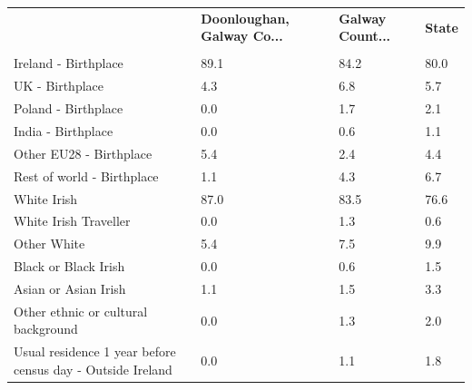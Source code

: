 \documentclass{article}
\begin{document}
\pagebreak
\begin{table}[h]	
\centering
		\begin{tabular}{KTTT}
  \hline
& \textbf{Doonloughan, Galway Co...} & \textbf{Galway Count...} & \textbf{State}\\ 
  \hline
    \\ 
    \hline
Ireland - Birthplace & 89.1& 84.2& 80.0\\
UK - Birthplace & 4.3& 6.8& 5.7\\
Poland - Birthplace & 0.0& 1.7& 2.1\\
India - Birthplace & 0.0& 0.6& 1.1\\
Other EU28 - Birthplace & 5.4& 2.4& 4.4\\
Rest of world - Birthplace & 1.1& 4.3& 6.7\\
    \hline
White Irish & 87.0& 83.5& 76.6\\
White Irish Traveller & 0.0& 1.3& 0.6\\
Other White & 5.4& 7.5& 9.9\\
Black or Black Irish & 0.0& 0.6& 1.5\\
Asian or Asian Irish & 1.1& 1.5& 3.3\\
Other ethnic or cultural background & 0.0& 1.3& 2.0\\
    \hline
Usual residence 1 year before census day - Outside Ireland & 0.0& 1.1& 1.8\\


\end{tabular}
\end{table}
\end{document}
